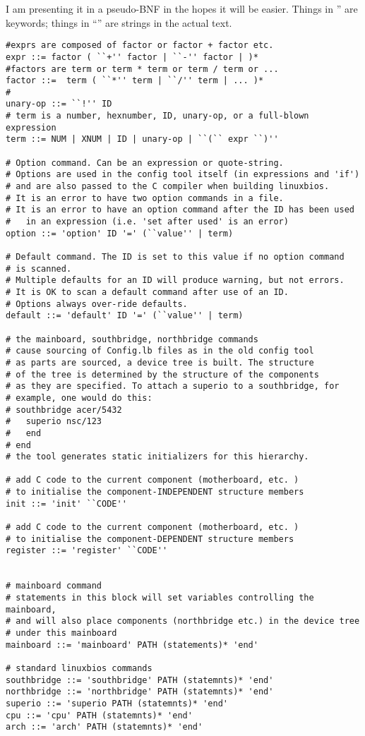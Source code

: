 I am presenting it in a pseudo-BNF in the hopes it will be easier. Things 
in '' are keywords; things in ``'' are strings in the actual text. 
\begin{verbatim}
#exprs are composed of factor or factor + factor etc.
expr ::= factor ( ``+'' factor | ``-'' factor | )*
#factors are term or term * term or term / term or ...
factor ::=  term ( ``*'' term | ``/'' term | ... )*
# 
unary-op ::= ``!'' ID
# term is a number, hexnumber, ID, unary-op, or a full-blown expression
term ::= NUM | XNUM | ID | unary-op | ``(`` expr ``)''

# Option command. Can be an expression or quote-string.
# Options are used in the config tool itself (in expressions and 'if')
# and are also passed to the C compiler when building linuxbios.
# It is an error to have two option commands in a file. 
# It is an error to have an option command after the ID has been used
#   in an expression (i.e. 'set after used' is an error)
option ::= 'option' ID '=' (``value'' | term)

# Default command. The ID is set to this value if no option command
# is scanned. 
# Multiple defaults for an ID will produce warning, but not errors. 
# It is OK to scan a default command after use of an ID.
# Options always over-ride defaults.
default ::= 'default' ID '=' (``value'' | term)

# the mainboard, southbridge, northbridge commands
# cause sourcing of Config.lb files as in the old config tool
# as parts are sourced, a device tree is built. The structure 
# of the tree is determined by the structure of the components
# as they are specified. To attach a superio to a southbridge, for
# example, one would do this:
# southbridge acer/5432 
#   superio nsc/123 
#   end 
# end
# the tool generates static initializers for this hierarchy.

# add C code to the current component (motherboard, etc. )
# to initialise the component-INDEPENDENT structure members
init ::= 'init' ``CODE''

# add C code to the current component (motherboard, etc. )
# to initialise the component-DEPENDENT structure members
register ::= 'register' ``CODE''


# mainboard command
# statements in this block will set variables controlling the mainboard,
# and will also place components (northbridge etc.) in the device tree
# under this mainboard
mainboard ::= 'mainboard' PATH (statements)* 'end'

# standard linuxbios commands
southbridge ::= 'southbridge' PATH (statemnts)* 'end'			
northbridge ::= 'northbridge' PATH (statemnts)* 'end'			
superio ::= 'superio PATH (statemnts)* 'end'			
cpu ::= 'cpu' PATH (statemnts)* 'end'			
arch ::= 'arch' PATH (statemnts)* 'end'			


\end{verbatim}
